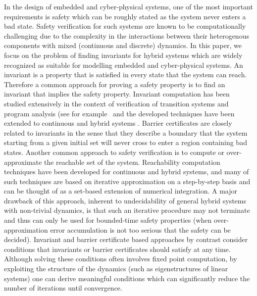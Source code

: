 In the design of embedded and cyber-physical systems, one of the most important requirements is safety which can be roughly stated as the system never enters a bad state. Safety verification for such systems are known to be computationally challenging due to the complexity in the interactions between their heterogenous components with mixed (continuous and discrete) dynamics. In this paper, we focus on the problem of finding invariants for hybrid systems which are widely recognized as suitable for modelling embedded and cyber-physical systems. An invariant is a property that is satisfied in every state that the system can reach. Therefore a common approach for proving a safety property is to find an invariant that implies the safety property. Invariant computation has been studied extensively in the context of verification of transition systems and program analysis (see for example~\cite{CousotHalbwachs78,DBLP:journals/fmsd/BensalemL99,DBLP:conf/tacas/TiwariRSS01,DBLP:conf/cav/ColonSS03,DBLP:conf/sas/Goubault13} and the developed techniques have been extended to continuous and hybrid systems \cite{DBLP:conf/hybrid/SankaranarayananSM04,jeannet2009apron,DBLP:conf/hybrid/Rodriguez-CarbonellT05,DBLP:conf/cdc/SassiGS14,DBLP:journals/tecs/AllamigeonGSGP16,HybridFluctuat,DBLP:conf/vmcai/SogokonGJP16,DBLP:conf/aplas/DangG11}. Barrier certificates \cite{prajna2004safety} are closely related to invariants in the sense that they describe a boundary that the system starting from a given initial set will never cross to enter a region containing bad states. Another common approach to safety verification is to compute or over-approximate the reachable set of the system. Reachability computation techniques have been developed for continuous and hybrid systems, and many of such techniques are based on iterative approximation on a step-by-step basis and can be thought of as a set-based extension of numerical integration. A major drawback of this approach, inherent to undecidability of general hybrid systems with non-trivial dynamics, is that such an iterative procedure may not terminate and thus can only be used for bounded-time safety properties (when over-approximation error accumulation is not too serious that the safety can be decided). Invariant and barrier certificate based approaches by contrast consider conditions that invariants or barrier certificates should satisfy at any time. Although solving these conditions often involves fixed point computation, by exploiting the structure of the dynamics (such as eigenstructures of linear systems) one can derive meaningful conditions which can significantly reduce the number of iterations until convergence.

